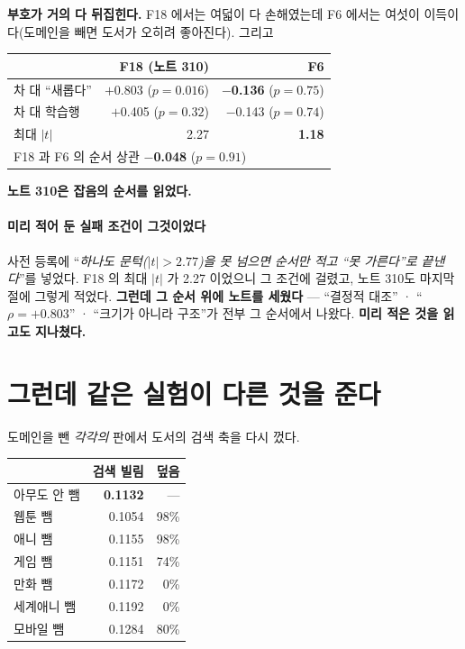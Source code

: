 \documentclass[10pt]{article}
\begin{document}
\textbf{부호가 거의 다 뒤집힌다.} F18 에서는 여덟이 다 손해였는데 F6 에서는
여섯이 이득이다(도메인을 빼면 도서가 오히려 좋아진다). 그리고

\begin{center}\small
\begin{tabular}{lrr}
\hline
& F18 (노트 310) & \textbf{F6} \\
\hline
차 대 ``새롭다'' & $+$0.803 ($p{=}0.016$) & \textbf{$-$0.136} ($p{=}0.75$) \\
차 대 학습행 & $+$0.405 ($p{=}0.32$) & $-$0.143 ($p{=}0.74$) \\
최대 $|t|$ & 2.27 & \textbf{1.18} \\
\hline
\multicolumn{3}{l}{F18 과 F6 의 순서 상관 \textbf{$-$0.048} ($p{=}0.91$)} \\
\hline
\end{tabular}
\end{center}

\textbf{노트 310은 잡음의 순서를 읽었다.}

\paragraph{미리 적어 둔 실패 조건이 그것이었다} 사전 등록에
``\emph{하나도 문턱($|t|{>}2.77$)을 못 넘으면 순서만 적고 ``못 가른다''로
끝낸다}''를 넣었다. F18 의 최대 $|t|$ 가 2.27 이었으니 그 조건에 걸렸고,
노트 310도 마지막 절에 그렇게 적었다. \textbf{그런데 그 순서 위에 노트를
세웠다} --- ``결정적 대조'' · ``$\rho{=}{+}0.803$'' · ``크기가 아니라 구조''가
전부 그 순서에서 나왔다. \textbf{미리 적은 것을 읽고도 지나쳤다.}

\section{그런데 같은 실험이 다른 것을 준다}

도메인을 뺀 \emph{각각의} 판에서 도서의 검색 축을 다시 껐다.

\begin{center}\footnotesize
\begin{tabular}{lrr}
\hline
& 검색 빌림 & 덮음 \\
\hline
아무도 안 뺌 & \textbf{0.1132} & --- \\
웹툰 뺌 & 0.1054 & 98\% \\
애니 뺌 & 0.1155 & 98\% \\
게임 뺌 & 0.1151 & 74\% \\
만화 뺌 & 0.1172 & 0\% \\
세계애니 뺌 & 0.1192 & 0\% \\
모바일 뺌 & 0.1284 & 80\% \\
\hline
\end{tabular}
\end{center}
\end{document}
